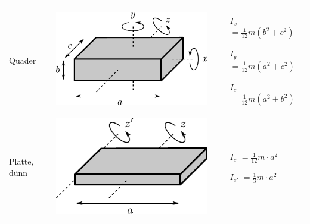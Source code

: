 \begin{table}[h!]
\begin{tabular}{m{2cm} c m{}}
Quader &
        \begin{minipage}{0.3\textwidth}
        \centering
        \includegraphics[scale=\traegscale]{traeg/traeg-quader.pdf}
        \end{minipage} &
                \begin{itemize}
                \item[$I_x$]$= \frac{1}{12} m \left(b^2 + c^2\right)$
                \item[$I_y$]$= \frac{1}{12} m \left(a^2 + c^2\right)$
                \item[$I_z$]$= \frac{1}{12} m \left(a^2 + b^2\right)$
                \end{itemize} \\
Platte, dünn &
        \begin{minipage}{0.3\textwidth}
        \includegraphics[scale=\traegscale]{traeg/traeg-platte.pdf}
        \end{minipage} &
                \begin{itemize}
                \item[$I_z$]$= \frac{1}{12} m \cdot a^2$
                \item[$I_{z'}$]$= \frac{1}{3} m \cdot a^2$
                \end{itemize} \\
\end{tabular}
\end{table}

